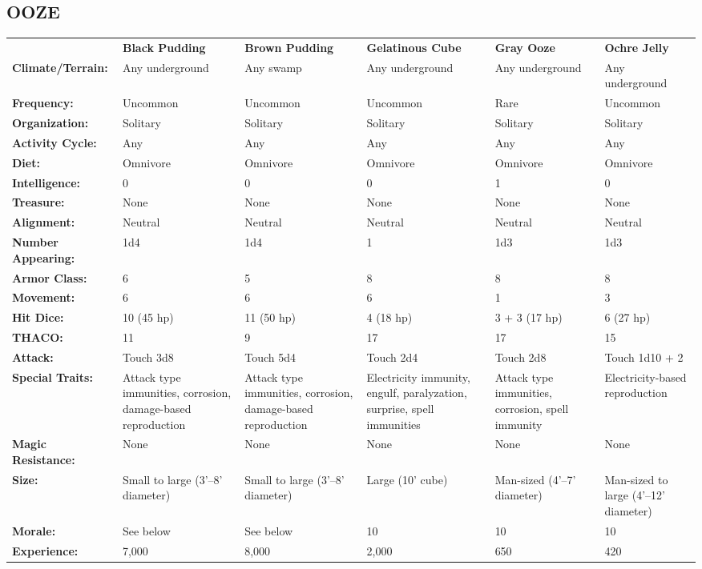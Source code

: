 \noindent
\begin{minipage}{\columnwidth}

\subsection{OOZE}

\noindent \begin{tabular}{p{}g{.135\columnwidth}p{.13\columnwidth}g{.135\columnwidth}p{.135\columnwidth}g{.135\columnwidth}}
	& \textbf{Black Pudding}	& \textbf{Brown Pudding}	& \textbf{Gelatinous Cube}	& \textbf{Gray Ooze}	& \textbf{Ochre Jelly}	\\
\textbf{Climate/Terrain:}	& Any underground	& Any swamp	& Any underground	& Any underground	& Any underground	\\
\textbf{Frequency:} 		& Uncommon	& Uncommon	& Uncommon	& Rare	& Uncommon	\\
\textbf{Organization:} 		& Solitary	& Solitary	& Solitary	& Solitary	& Solitary	\\
\textbf{Activity Cycle:} 	& Any	& Any	& Any	& Any	& Any	\\
\textbf{Diet:} 				& Omnivore	& Omnivore	& Omnivore	& Omnivore	& Omnivore	\\
\textbf{Intelligence:} 		& 0	& 0	& 0	& 1	& 0	\\
\textbf{Treasure:} 			& None	& None	& None	& None	& None	\\
\textbf{Alignment:} 		& Neutral	& Neutral	& Neutral	& Neutral	& Neutral	\\
\hline
\textbf{Number Appearing:} 	& 1d4	& 1d4	& 1	& 1d3	& 1d3	\\
\textbf{Armor Class:} 		& 6	& 5	& 8	& 8	& 8	\\
\textbf{Movement:} 			& 6	& 6	& 6	& 1	& 3	\\
\textbf{Hit Dice:} 			& 10 (45 hp)	& 11 (50 hp)	& 4 (18 hp)	& 3 + 3	(17 hp)	& 6	(27 hp)	\\
\textbf{THACO:} 			& 11	& 9	& 17	& 17	& 15	\\
\textbf{Attack:} 			& Touch 3d8	& Touch 5d4	& Touch 2d4	& Touch 2d8	& Touch 1d10 + 2	\\
\textbf{Special Traits:} & Attack type immunities, corrosion, damage-based reproduction 	& Attack type immunities, corrosion, damage-based reproduction	&  Electricity immunity, engulf, paralyzation, surprise, spell immunities	& Attack type immunities, corrosion, spell immunity	& Electricity-based reproduction	\\
\textbf{Magic Resistance:} 	& None	& None	& None	& None	& None	\\
\textbf{Size:} 				& Small to large (3'--8' diameter)	& Small to large (3'--8' diameter)	& Large (10' cube)	& Man-sized (4'--7' diameter)	& Man-sized to large (4'--12' diameter)	\\
\textbf{Morale:} 			& See below	& See below	& 10	& 10	& 10	\\
\textbf{Experience:} 		& 7,000	& 8,000	& 2,000	& 650	& 420	\\ %
\end{tabular}

\end{minipage}

